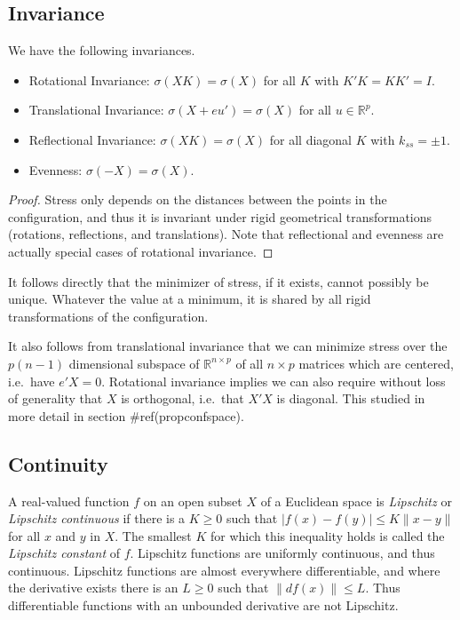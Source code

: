 \documentclass[
  12pt,
  letterpaper,
  DIV=11,
  numbers=noendperiod]{scrreprt}
\providecommand{\tightlist}{%
  \setlength{\itemsep}{0pt}\setlength{\parskip}{0pt}}\usepackage{longtable,booktabs,array}
\theoremstyle{remark}
\begin{document}
\subsection{Invariance}\label{propinvariance}

\label{propinvar}
We have the following invariances.

\begin{itemize}
\tightlist
\item
  Rotational Invariance: \(\sigma(XK)=\sigma(X)\) for all \(K\) with
  \(K'K=KK'=I\).
\item
  Translational Invariance: \(\sigma(X+eu')=\sigma(X)\) for all
  \(u\in\mathbb{R}^p\).
\item
  Reflectional Invariance: \(\sigma(XK)=\sigma(X)\) for all diagonal
  \(K\) with \(k_{ss}=\pm 1\).
\item
  Evenness: \(\sigma(-X)=\sigma(X)\).
\end{itemize}

\begin{proof}
Stress only depends on the distances between the points in the
configuration, and thus it is invariant under rigid geometrical
transformations (rotations, reflections, and translations). Note that
reflectional and evenness are actually special cases of rotational
invariance.
\end{proof}

It follows directly that the minimizer of stress, if it exists, cannot
possibly be unique. Whatever the value at a minimum, it is shared by all
rigid transformations of the configuration.

It also follows from translational invariance that we can minimize
stress over the \(p(n-1)\) dimensional subspace of
\(\mathbb{R}^{n\times p}\) of all \(n\times p\) matrices which are
centered, i.e.~have \(e'X=0\). Rotational invariance implies we can also
require without loss of generality that \(X\) is orthogonal, i.e.~that
\(X'X\) is diagonal. This studied in more detail in section
\#ref(propconfspace).

\subsection{Continuity}\label{propcontinuity}

A real-valued function \(f\) on an open subset \(X\) of a Euclidean
space is \emph{Lipschitz} or \emph{Lipschitz continuous} if there is a
\(K\geq 0\) such that \(|f(x)-f(y)|\leq K\|x-y\|\) for all \(x\) and
\(y\) in \(X\). The smallest \(K\) for which this inequality holds is
called the \emph{Lipschitz constant} of \(f\). Lipschitz functions are
uniformly continuous, and thus continuous. Lipschitz functions are
almost everywhere differentiable, and where the derivative exists there
is an \(L\geq 0\) such that \(\|df(x)\|\leq L\). Thus differentiable
functions with an unbounded derivative are not Lipschitz.
\end{document}
